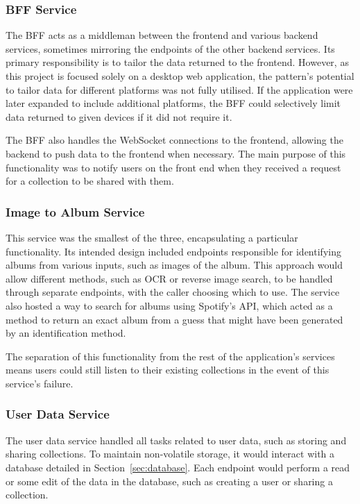 \subsubsection{BFF Service}
The BFF acts as a middleman between the frontend and various backend services, sometimes mirroring the endpoints of the other backend services. Its primary responsibility is to tailor the data returned to the frontend. However, as this project is focused solely on a desktop web application, the pattern's potential to tailor data for different platforms was not fully utilised. If the application were later expanded to include additional platforms, the BFF could selectively limit data returned to given devices if it did not require it.

The BFF also handles the WebSocket connections to the frontend, allowing the backend to push data to the frontend when necessary. The main purpose of this functionality was to notify users on the front end when they received a request for a collection to be shared with them.

\subsubsection{Image to Album Service}
This service was the smallest of the three, encapsulating a particular functionality. Its intended design included endpoints responsible for identifying albums from various inputs, such as images of the album. This approach would allow different methods, such as OCR or reverse image search, to be handled through separate endpoints, with the caller choosing which to use. The service also hosted a way to search for albums using Spotify's API, which acted as a method to return an exact album from a guess that might have been generated by an identification method.

The separation of this functionality from the rest of the application's services means users could still listen to their existing collections in the event of this service's failure.

\subsubsection{User Data Service}
The user data service handled all tasks related to user data, such as storing and sharing collections. To maintain non-volatile storage, it would interact with a database detailed in Section~\ref{sec:database}. Each endpoint would perform a read or some edit of the data in the database, such as creating a user or sharing a collection.

